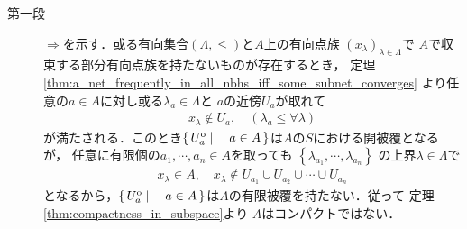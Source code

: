 	\begin{prf}\mbox{}
		\begin{description}
			\item[第一段]
				$\Longrightarrow$を示す．或る有向集合$(\Lambda,\leq)$と$A$上の有向点族
				$(x_\lambda)_{\lambda \in \Lambda}$で
				$A$で収束する部分有向点族を持たないものが存在するとき，
				定理\ref{thm:a_net_frequently_in_all_nbhs_iff_some_subnet_converges}
				より任意の$a \in A$に対し或る$\lambda_a \in \Lambda$と
				$a$の近傍$U_a$が取れて
				\begin{align}
					x_\lambda \notin U_a, \quad (\lambda_a \leq \forall \lambda)
				\end{align}
				が満たされる．このとき$\left\{\, U_a^{\mathrm{o}} \mid \quad a \in A\, \right\}$は$A$の$S$における開被覆となるが，
				任意に有限個の$a_1,\cdots,a_n \in A$を取っても
				$\left\{\lambda_{a_1},\cdots,\lambda_{a_n}\right\}$
				の上界$\lambda \in \Lambda$で
				\begin{align}
					x_\lambda \in A,
					\quad x_\lambda \notin U_{a_1} \cup U_{a_2} \cup \cdots \cup U_{a_n}
				\end{align}
				となるから，$\left\{\, U_a^{\mathrm{o}} \mid \quad a \in A\, \right\}$は$A$の有限被覆を持たない．従って
				定理\ref{thm:compactness_in_subspace}より
				$A$はコンパクトではない．
				

\end{description}
\end{prf}

